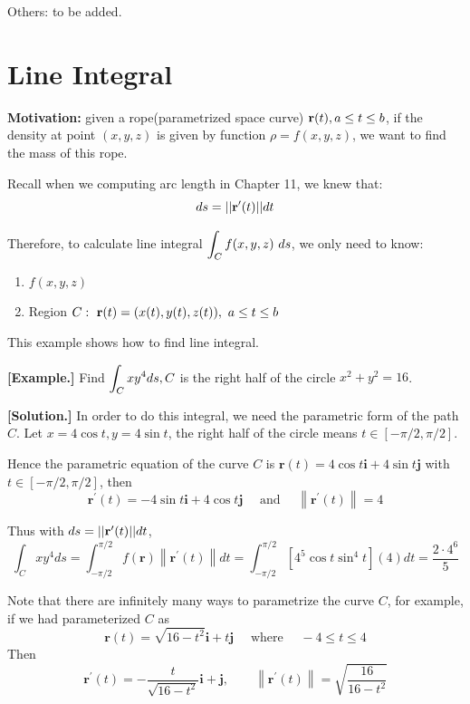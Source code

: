 \documentclass[11pt, a4paper]{MATH2023}
\newcommand{\eg}{\textbf{[Example.] }}
\newcommand{\sol}{\textbf{[Solution.] }}
\newcommand{\rr}{{\bf r}}
\begin{document}
\begin{spacing}{1.3}
    {\blue Others: to be added.}



    \newpage
    \section{Line Integral}
    {\bf Motivation:} given a rope(parametrized space curve) $\rr(t), a\le t\le b$, if the density at 
    point $(x,y,z)$ is given by function $\rho =f(x,y,z)$, we want to find the mass of this rope.
    \begin{center}
    \end{center}

    Recall when we computing arc length in Chapter 11, we knew that: 
    $$ds=||\rr'(t)|| dt$$

    Therefore, to calculate line integral $\displaystyle \int_C f(x,y,z)\ ds$, we only need to know: 
    \begin{enumerate}
        \item $f(x,y,z)$
        \item Region $C:\ \rr(t)=(x(t), y(t), z(t)),\ a\le t\le b$
    \end{enumerate}

    {\blue This example shows how to find line integral.}

    \eg Find $\displaystyle \int_{C} x y^{4} d s, C$ is the right half of the circle $x^{2}+y^{2}=16$.

    \sol In order to do this integral, we need the parametric form of the path $C$.
    Let $x=4\cos t, y=4\sin t$, the right half of the circle means $t \in[-\pi / 2, \pi / 2]$.

    Hence the parametric equation of the curve $C$ is
    $\mathbf{r}(t)=4 \cos t \mathbf{i}+4 \sin t \mathbf{j}$ with $t \in[-\pi / 2, \pi / 2]$, then
    $$\mathbf{r}^{\prime}(t)=-4 \sin t \mathbf{i}+4 \cos t \mathbf{j} \quad \text { and } \quad\left\|\mathbf{r}^{\prime}(t)\right\|=4$$

    Thus with $ds=||\rr'(t)|| dt$,
    $$\int_{C} x y^{4} d s =\int_{-\pi / 2}^{\pi / 2} f(\mathbf{r})\left\|\mathbf{r}^{\prime}(t)\right\| d t=
    \int_{-\pi / 2}^{\pi / 2}\left[4^{5} \cos t \sin ^{4} t\right](4) d t =\frac{2\cdot 4^6}{5}$$

    {\blue Note that there are infinitely many ways to parametrize the curve $C$, }
    for example, if we had parameterized $C$ as
    $$\mathbf{r}(t)=\sqrt{16-t^{2}} \mathbf{i}+t \mathbf{j} \quad \text { where } \quad-4 \leqslant t \leqslant 4$$
    Then
    $$\mathbf{r}^{\prime}(t) =-\frac{t}{\sqrt{16-t^{2}}} \mathbf{i}+\mathbf{j}, \qquad
    \left\|\mathbf{r}^{\prime}(t)\right\| =\sqrt{\frac{16}{16-t^{2}}} $$


\end{spacing}
\end{document}
